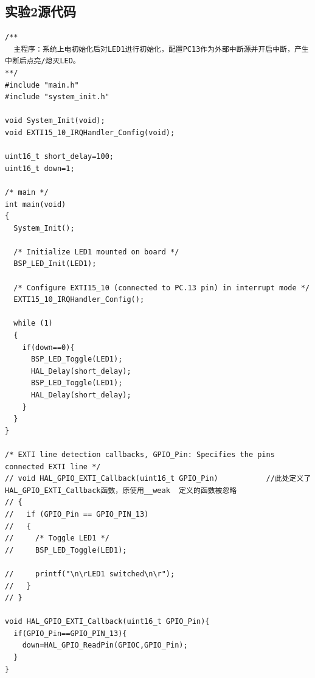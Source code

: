 ﻿\documentclass[UTF8,12pt]{article}
\begin{document}
\subsection{实验2源代码}
\begin{lstlisting}[frame=shadowbox]
/**
  主程序：系统上电初始化后对LED1进行初始化，配置PC13作为外部中断源并开启中断，产生中断后点亮/熄灭LED。
**/
#include "main.h"
#include "system_init.h"

void System_Init(void);
void EXTI15_10_IRQHandler_Config(void);

uint16_t short_delay=100;
uint16_t down=1;

/* main */
int main(void)
{
  System_Init();
  
  /* Initialize LED1 mounted on board */
  BSP_LED_Init(LED1);
  
  /* Configure EXTI15_10 (connected to PC.13 pin) in interrupt mode */
  EXTI15_10_IRQHandler_Config();
  
  while (1)
  {
    if(down==0){
      BSP_LED_Toggle(LED1);
      HAL_Delay(short_delay);
      BSP_LED_Toggle(LED1);
      HAL_Delay(short_delay);
    }
  }
}

/* EXTI line detection callbacks, GPIO_Pin: Specifies the pins connected EXTI line */
// void HAL_GPIO_EXTI_Callback(uint16_t GPIO_Pin)			//此处定义了HAL_GPIO_EXTI_Callback函数，原使用__weak  定义的函数被忽略
// {
//   if (GPIO_Pin == GPIO_PIN_13)
//   {
//     /* Toggle LED1 */
//     BSP_LED_Toggle(LED1);
    
//     printf("\n\rLED1 switched\n\r");
//   }
// }

void HAL_GPIO_EXTI_Callback(uint16_t GPIO_Pin){
  if(GPIO_Pin==GPIO_PIN_13){
    down=HAL_GPIO_ReadPin(GPIOC,GPIO_Pin);
  }
}
\end{lstlisting}

\newpage
\end{document}
